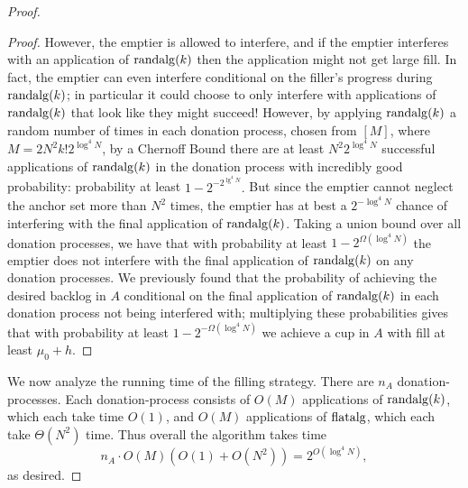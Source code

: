 \begin{proof}
\begin{proof}
  However, the emptier is allowed to interfere, and if the
  emptier interferes with an application of $\operatorname{\text{\textup{randalg}}}(k)$ then
  the application might not get large fill. In fact, the emptier
  can even interfere conditional on the filler's progress during
  $\operatorname{\text{\textup{randalg}}}(k)$; in particular it could choose to only interfere
  with applications of $\operatorname{\text{\textup{randalg}}}(k)$ that look like they might
  succeed! However, by applying $\operatorname{\text{\textup{randalg}}}(k)$ a random
  number of times in each donation process, chosen from $[M]$,
  where $M = 2N^2 k! 2^{\log^4 N}$, by a Chernoff Bound there are
  at least $N^2 2^{\log^4 N}$ successful applications of
  $\operatorname{\text{\textup{randalg}}}(k)$ in the donation process with incredibly good
  probability: probability at least $1-2^{-2^{\lg^4 N}}.$
  But since the emptier cannot neglect the anchor set more than
  $N^2$ times, the emptier has at best a $2^{-\log^4 N}$ chance
  of interfering with the final application of $\operatorname{\text{\textup{randalg}}}(k)$. 
  Taking a union bound over all donation processes, we have that
  with probability at least $1-2^{\Omega(\log^4 N)}$ the emptier
  does not interfere with the final application of $\operatorname{\text{\textup{randalg}}}(k)$
  on any donation processes. We previously found that the
  probability of achieving the desired backlog in $A$ conditional
  on the final application of $\operatorname{\text{\textup{randalg}}}(k)$ in each donation
  process not being interfered with; multiplying these
  probabilities gives that with probability at least
  $1-2^{-\Omega(\log^4 N)}$ we achieve a cup in $A$ with fill
  at least $\mu_0 + h$.

\end{proof}

We now analyze the running time of the filling strategy. There
are $n_A$ donation-processes. Each donation-process consists of
$O(M)$ applications of $\operatorname{\text{\textup{randalg}}}(k)$, which each take time
$O(1)$, and $O(M)$ applications of $\operatorname{\text{\textup{flatalg}}}$, which each take
$\Theta(N^2)$ time. Thus overall the algorithm takes time $$n_A
\cdot O(M) (O(1) + O(N^2)) = 2^{O(\log^4 N)},$$ as desired.
  
\end{proof}

